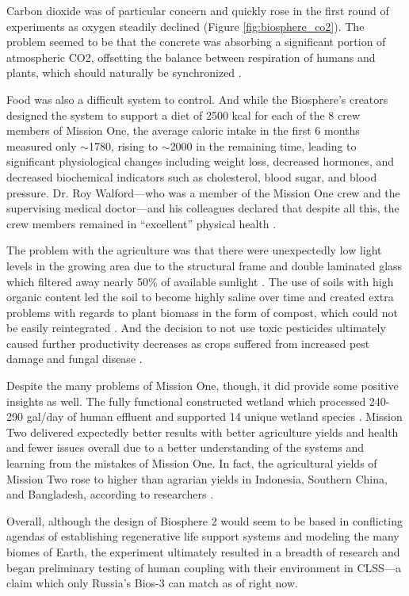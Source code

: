 Carbon dioxide was of particular concern and quickly rose in the first round of experiments as oxygen steadily declined (Figure \ref{fig:biosphere_co2}). The problem seemed to be that the concrete was absorbing a significant portion of atmospheric CO2, offsetting the balance between respiration of humans and plants, which should naturally be synchronized \cite{biosphere_design}.

Food was also a difficult system to control. And while the Biosphere’s creators designed the system to support a diet of 2500 kcal for each of the 8 crew members of Mission One, the average caloric intake in the first 6 months measured only $\sim$1780, rising to $\sim$2000 in the remaining time, leading to significant physiological changes including weight loss, decreased hormones, and decreased biochemical indicators such as cholesterol, blood sugar, and blood pressure. Dr. Roy Walford—who was a member of the Mission One crew and the supervising medical doctor—and his colleagues declared that despite all this, the crew members remained in “excellent” physical health \cite{biosphere_diet}.

The problem with the agriculture was that there were unexpectedly low light levels in the growing area due to the structural frame and double laminated glass which filtered away nearly 50\% of available sunlight \cite{biosphere_design}. The use of soils with high organic content led the soil to become highly saline over time and created extra problems with regards to plant biomass in the form of compost, which could not be easily reintegrated \cite{biosphere_agriculture}. And the decision to not use toxic pesticides ultimately caused further productivity decreases as crops suffered from increased pest damage and fungal disease \cite{biosphere_agriculture}.

Despite the many problems of Mission One, though, it did provide some positive insights as well. The fully functional constructed wetland which processed 240-290 gal/day of human effluent and supported 14 unique wetland species \cite{biosphere_wastewater}. Mission Two delivered expectedly better results with better agriculture yields and health and fewer issues overall due to a better understanding of the systems and learning from the mistakes of Mission One. In fact, the agricultural yields of Mission Two rose to higher than agrarian yields in Indonesia, Southern China, and Bangladesh, according to researchers \cite{biosphere_agriculture}.

Overall, although the design of Biosphere 2 would seem to be based in conflicting agendas of establishing regenerative life support systems and modeling the many biomes of Earth, the experiment ultimately resulted in a breadth of research and began preliminary testing of human coupling with their environment in CLSS---a claim which only Russia’s Bios-3 can match as of right now.
